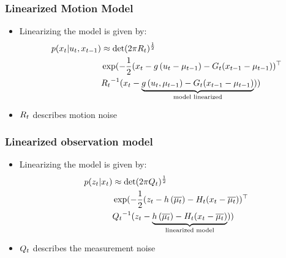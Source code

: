     \begin{frame}
    \frametitle{Linearized Motion Model}
    
    \begin{itemize}
    \item Linearizing the model is given by:
    \begin{align*}
    p(x_{t} | u_{t}, x _{t-1}) &\approx \det(2 \pi R_{t})^{\frac{1}{2}}\\
     &\exp (-\dfrac{1}{2} (x_{t} - g\left( u_{t}-\mu_{t-1} \right) - G_{t}(x_{t-1}-\mu_{t-1}))^{\top}\\
     &{R_{t}}^{-1} (x_{t} - \underbrace{g\left( u_{t},\mu_{t-1} \right) - G_{t} (x_{t-1}-\mu_{t-1})}_{\text{model linearized}}))
    \end{align*}
    
    \item $R_{t}$ describes motion noise
    \end{itemize}
    \end{frame}
    
    \begin{frame}
    \frametitle{Linearized observation model}
    
    \begin{itemize}
    \item Linearizing the model is given by:
    \begin{align*}
    p(z_{t} | x_{t}) &\approx \det(2 \pi Q_{t})^{\frac{1}{2}}\\
    &\exp (-\dfrac{1}{2} (z_{t} - h\left( \overline{\mu_{t}} \right) - H_{t}(x_{t} - \overline{\mu _{t}}))^{\top}\\
     &{Q_{t}}^{-1} (z_{t} - \underbrace{h\left( \overline{\mu_{t}} \right) - H_{t} (x_{t}-\overline{\mu_{t}})}_{\text{linearized model}}))
     \end{align*}
    
     \item $Q_{t}$ describes the measurement noise
     \end{itemize}
    
    
\end{frame}

